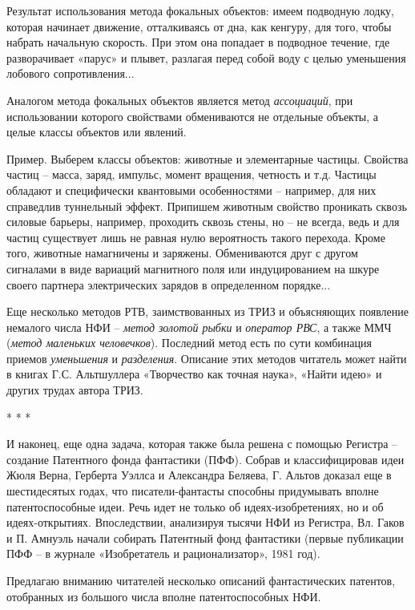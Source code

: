 \documentclass[11pt,a4paper]{article}
\begin{document}
Результат использования метода фокальных объектов: имеем подводную лодку,
которая начинает движение, отталкиваясь от дна, как кенгуру, для того, чтобы
набрать начальную скорость. При этом она попадает в подводное течение, где
разворачивает «парус» и плывет, разлагая перед собой воду с целью уменьшения
лобового сопротивления...

Аналогом метода фокальных объектов является метод \emph{ассоциаций}, при
использовании которого свойствами обмениваются не отдельные объекты, а целые
классы объектов или явлений.

Пример. Выберем классы объектов: животные и элементарные частицы. Свойства
частиц -- масса, заряд, импульс, момент вращения, четность и т.д. Частицы
обладают и специфически квантовыми особенностями -- например, для них
справедлив туннельный эффект. Припишем животным свойство проникать сквозь
силовые барьеры, например, проходить сквозь стены, но -- не всегда, ведь и для
частиц существует лишь не равная нулю вероятность такого перехода. Кроме того,
животные намагничены и заряжены. Обмениваются друг с другом сигналами в виде
вариаций магнитного поля или индуцированием на шкуре своего партнера
электрических зарядов в определенном порядке...

Еще несколько методов РТВ, заимствованных из ТРИЗ и объясняющих появление
немалого числа НФИ -- \emph{метод золотой рыбки} и \emph{оператор РВС}, а
также ММЧ (\emph{метод маленьких человечков}). Последний метод есть по сути
комбинация приемов \emph{уменьшения} и \emph{разделения}. Описание этих
методов читатель может найти в книгах Г.С. Альтшуллера «Творчество как точная
наука», «Найти идею» и других трудах автора ТРИЗ.

\begin{center}
  * * *
\end{center}
И наконец, еще одна задача, которая также была решена с помощью Регистра --
создание Патентного фонда фантастики (ПФФ). Собрав и классифицировав идеи Жюля
Верна, Герберта Уэллса и Александра Беляева, Г. Альтов доказал еще в
шестидесятых годах, что писатели-фантасты способны придумывать вполне
патентоспособные идеи. Речь идет не только об идеях-изобретениях, но и об
идеях-открытиях. Впоследствии, анализируя тысячи НФИ из Регистра, Вл. Гаков и
П. Амнуэль начали собирать Патентный фонд фантастики (первые публикации ПФФ --
в журнале «Изобретатель и рационализатор», 1981 год).

Предлагаю вниманию читателей несколько описаний фантастических патентов,
отобранных из большого числа вполне патентоспособных НФИ.
\end{document}
